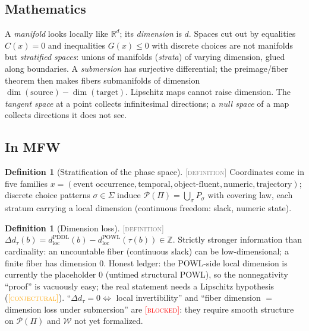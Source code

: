 \documentclass[11pt]{article}
\newcommand{\DEFINITION}{\textcolor{gray}{\textsc{[definition]}}}
\newcommand{\CONJECTURAL}{\textcolor{orange}{\textsc{[conjectural]}}}
\newcommand{\BLOCKED}{\textcolor{red}{\textsc{[blocked]}}}
\newcommand{\PT}{\Pi}
\newcommand{\PS}{\mathcal{P}(\PT)}
\newcommand{\WS}{\mathcal{W}}
\newcommand{\R}{\mathbb{R}}
\newcommand{\Z}{\mathbb{Z}}
\theoremstyle{plain}
\theoremstyle{definition}
\newtheorem{definition}[theorem]{Definition}
\theoremstyle{remark}
\begin{document}
\subsection{Mathematics}
A \emph{manifold} looks locally like $\R^d$; its \emph{dimension} is $d$.
Spaces cut out by equalities $C(x) = 0$ and inequalities $G(x) \le 0$ with
discrete choices are not manifolds but \emph{stratified spaces}: unions of
manifolds (\emph{strata}) of varying dimension, glued along boundaries.
A \emph{submersion} has surjective differential; the preimage/fiber theorem
then makes fibers submanifolds of dimension
$\dim(\text{source}) - \dim(\text{target})$. Lipschitz maps cannot raise
dimension. The \emph{tangent space} at a point collects infinitesimal
directions; a \emph{null space} of a map collects directions it does not
see.

\subsection{In MFW}
\begin{definition}[Stratification of the phase space]\DEFINITION\;
Coordinates come in five families
$x = (\text{event occurrence}, \text{temporal}, \text{object-fluent},
\text{numeric}, \text{trajectory})$; discrete choice patterns
$\sigma \in \Sigma$ induce
$\PS = \bigcup_\sigma P_\sigma$ with covering law, each stratum carrying a
local dimension (continuous freedom: slack, numeric state).
\end{definition}

\begin{definition}[Dimension loss]\DEFINITION\;
$\Delta d_\tau(b) = d^{\mathrm{PDDL}}_{\mathrm{loc}}(b)
- d^{\mathrm{POWL}}_{\mathrm{loc}}(\tau(b)) \in \Z$. Strictly stronger
information than cardinality: an uncountable fiber (continuous slack) can
be low-dimensional; a finite fiber has dimension 0. Honest ledger: the
POWL-side local dimension is currently the placeholder $0$ (untimed
structural POWL), so the nonnegativity ``proof'' is vacuously easy; the
real statement needs a Lipschitz hypothesis (\CONJECTURAL).
``$\Delta d_\tau = 0 \iff$ local invertibility'' and ``fiber dimension
$=$ dimension loss under submersion'' are \BLOCKED: they require smooth
structure on $\PS$ and $\WS$ not yet formalized.
\end{definition}
\end{document}

